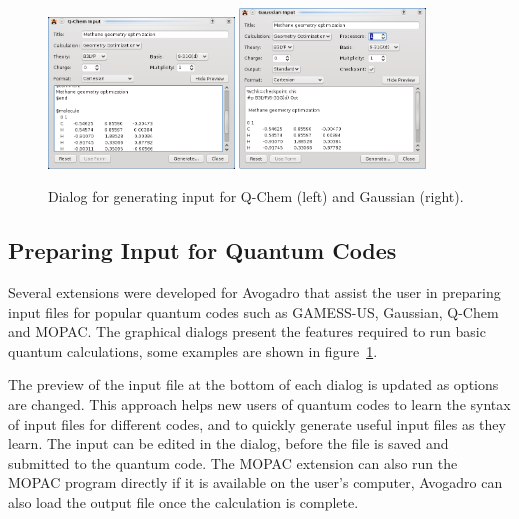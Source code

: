 \documentclass{article}
\begin{document}
\begin{figure}
	\includegraphics[width=0.44\textwidth]{images/avogadro-q-chem}
	\hspace{0.1cm}
	\includegraphics[width=0.44\textwidth]{images/avogadro-gaussian}
	\caption{Dialog for generating input for Q-Chem (left) and Gaussian (right).}
	\label{f:quantumdialogs}
\end{figure}

\subsection{Preparing Input for Quantum Codes}

Several extensions were developed for Avogadro that assist the user in preparing input files for popular quantum codes such as GAMESS-US, Gaussian, Q-Chem and MOPAC. The graphical dialogs present the features required to run basic quantum calculations, some examples are shown in figure~\ref{f:quantumdialogs}.

The preview of the input file at the bottom of each dialog is updated as options are changed. This approach helps new users of quantum codes to learn the syntax of input files for different codes, and to quickly generate useful input files as they learn. The input can be edited in the dialog, before the file is saved and submitted to the quantum code. The MOPAC extension can also run the  MOPAC program directly if it is available on the user's computer, Avogadro can also load the output file once the calculation is complete.
\end{document}
